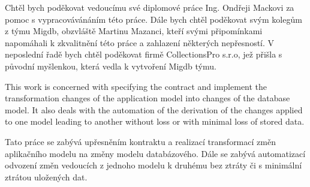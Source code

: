 \documentclass[11pt,twoside,a4paper]{book}
\begin{document}

\coverpagestarts


\acknowledgements
\noindent
Chtěl bych poděkovat vedoucímu své diplomové práce Ing. Ondřeji Mackovi za pomoc
s vypracovávánáním této práce. Dále bych chtěl poděkovat svým kolegům z týmu
Migdb, obzvláště Martinu Mazanci, kteří svými připomínkami napomáhali k zkvalitnění této práce a
zahlazení některých nepřesností. V neposlední řadě bych chtěl poděkovat
firmě CollectionsPro s.r.o, jež přišla s původní myšlenkou, která vedla k
vytvoření Migdb týmu.





 
\abstractpage
\noindent 
This work is concerned with specifying the contract and implement the transformation changes 
of the application model into changes of the database model. It also
deals with the automation of the derivation of the changes applied to one model
leading to another without loss or with minimal loss of stored data.


\baselineskip

\noindent
Tato práce se zabývá upřesněním kontraktu a realizací transformací změn
aplikačního modelu na změny modelu databázového. Dále se zabývá automatizací odvození změn vedoucích z
jednoho modelu k druhému bez ztráty či s minimální ztrátou uložených dat.

\noindent


\tableofcontents



\listoffigures


\end{document}
